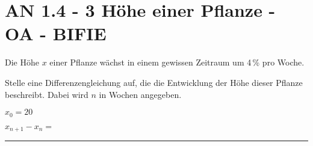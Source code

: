 \section{AN 1.4 - 3 Höhe einer Pflanze - OA - BIFIE}

\begin{beispiel}[AN 1.4]{1} %
Die Höhe $x$ einer Pflanze wächst in einem gewissen Zeitraum um 4\,\% pro Woche. \leer

Stelle eine Differenzengleichung auf, die die Entwicklung der Höhe dieser Pflanze beschreibt. Dabei wird $n$ in Wochen angegeben.


$x_0=20$

$x_{n+1}-x_n=$ \rule{5cm}{0.3pt}

\end{beispiel}